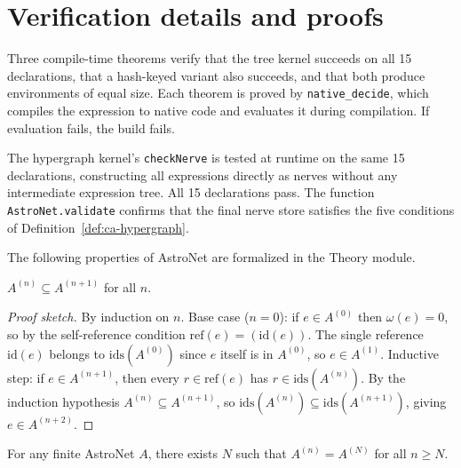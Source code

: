 
\section{Verification details and proofs}\label{app:verification}\label{app:proofs}

Three compile-time theorems verify that the tree kernel succeeds on all 15 declarations, that a hash-keyed variant also succeeds, and that both produce environments of equal size.  Each theorem is proved by \texttt{native\_decide}, which compiles the expression to native code and evaluates it during compilation.  If evaluation fails, the build fails.

The hypergraph kernel's \texttt{checkNerve} is tested at runtime on the same 15 declarations, constructing all expressions directly as nerves without any intermediate expression tree.  All 15 declarations pass.  The function \texttt{AstroNet.validate} confirms that the final nerve store satisfies the five conditions of Definition~\ref{def:ca-hypergraph}.

\bigskip

The following properties of AstroNet are formalized in the Theory module.

\begin{theorem}[Monotonicity]
$A^{(n)} \subseteq A^{(n+1)}$ for all $n$.
\end{theorem}

\begin{proof}[Proof sketch]
By induction on $n$.  Base case ($n = 0$): if $e \in A^{(0)}$ then $\omega(e) = 0$, so by the self-reference condition $\mathrm{ref}(e) = (\mathrm{id}(e))$.  The single reference $\mathrm{id}(e)$ belongs to $\mathrm{ids}(A^{(0)})$ since $e$ itself is in $A^{(0)}$, so $e \in A^{(1)}$.  Inductive step: if $e \in A^{(n+1)}$, then every $r \in \mathrm{ref}(e)$ has $r \in \mathrm{ids}(A^{(n)})$.  By the induction hypothesis $A^{(n)} \subseteq A^{(n+1)}$, so $\mathrm{ids}(A^{(n)}) \subseteq \mathrm{ids}(A^{(n+1)})$, giving $e \in A^{(n+2)}$.
\end{proof}

\begin{theorem}[Stabilization]\label{prop:stage-stabilize}
For any finite AstroNet $A$, there exists $N$ such that $A^{(n)} = A^{(N)}$ for all $n \geq N$.
\end{theorem}

